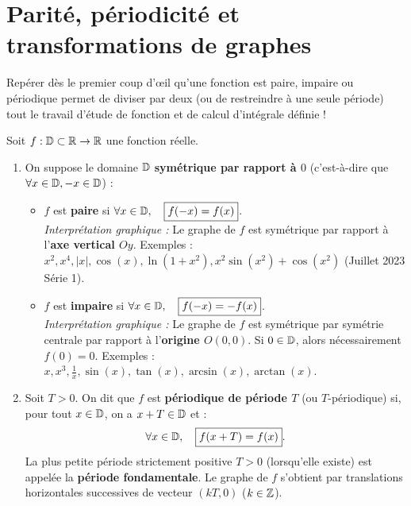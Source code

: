 \section{Parité, périodicité et transformations de graphes}

Repérer dès le premier coup d'œil qu'une fonction est paire, impaire ou périodique permet de diviser par deux (ou de restreindre à une seule période) tout le travail d'étude de fonction et de calcul d'intégrale définie !

\begin{definition}
Soit $f : \mathbb{D} \subset \mathbb{R} \to \mathbb{R}$ une fonction réelle.
\begin{enumerate}
    \item On suppose le domaine $\mathbb{D}$ \textbf{symétrique par rapport à $0$} (c'est-à-dire que $\forall x \in \mathbb{D}, -x \in \mathbb{D}$) :
    \begin{itemize}
        \item $f$ est \textbf{paire} si $\forall x \in \mathbb{D}, \quad \boxed{f(-x) = f(x)}$.\\
        \emph{Interprétation graphique :} Le graphe de $f$ est symétrique par rapport à l'\textbf{axe vertical $Oy$}. Exemples : $x^2, x^4, |x|, \cos(x), \ln(1+x^2), x^2\sin(x^2) + \cos(x^2)$ (Juillet 2023 Série 1).
        \item $f$ est \textbf{impaire} si $\forall x \in \mathbb{D}, \quad \boxed{f(-x) = -f(x)}$.\\
        \emph{Interprétation graphique :} Le graphe de $f$ est symétrique par symétrie centrale par rapport à l'\textbf{origine $O(0,0)$}. Si $0 \in \mathbb{D}$, alors nécessairement $f(0) = 0$. Exemples : $x, x^3, \frac{1}{x}, \sin(x), \tan(x), \arcsin(x), \arctan(x)$.
    \end{itemize}
    \item Soit $T > 0$. On dit que $f$ est \textbf{périodique de période $T$} (ou $T$-périodique) si, pour tout $x \in \mathbb{D}$, on a $x + T \in \mathbb{D}$ et :
    \[
        \forall x \in \mathbb{D}, \quad \boxed{f(x + T) = f(x)}.
    \]
    La plus petite période strictement positive $T > 0$ (lorsqu'elle existe) est appelée la \textbf{période fondamentale}. Le graphe de $f$ s'obtient par translations horizontales successives de vecteur $(kT, 0)$ ($k \in \mathbb{Z}$).
\end{enumerate}
\end{definition}

